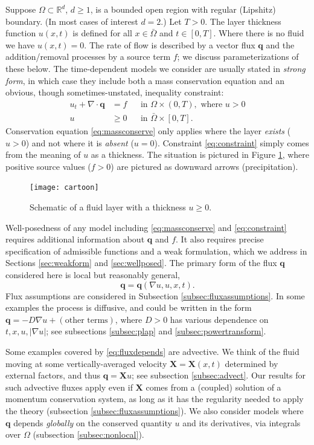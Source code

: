 \documentclass[final,leqno,onefignum,onetabnum]{siamltex1213bueler}
\newcommand\bq{\mathbf{q}}
\newcommand\bX{\mathbf{X}}
\newcommand{\Div}{\nabla\cdot}
\renewcommand{\grad}{\nabla}
\newcommand\RR{\mathbb{R}}
\begin{document}
Suppose $\Omega \subset \RR^d$, $d\ge 1$, is a bounded open region with regular (Lipshitz) boundary.  (In most cases of interest $d=2$.)  Let $T>0$.  The layer thickness function $u(x,t)$ is defined for all $x\in \bar\Omega$ and $t \in [0,T]$.  Where there is no fluid we have $u(x,t)=0$.  The rate of flow is described by a vector flux $\bq$ and the addition/removal processes by a source term $f$; we discuss parameterizations of these below.  The time-dependent models we consider are usually stated in \emph{strong form}, in which case they include both a mass conservation equation and an obvious, though sometimes-unstated, inequality constraint:
\begin{align}
u_t + \Div \bq &= f &&\text{in } \Omega \times (0,T), \text{ where } u > 0 \label{eq:massconserve} \\
u &\ge 0 &&\text{in } \bar\Omega \times [0,T]. \label{eq:constraint}
\end{align}
Conservation equation \eqref{eq:massconserve} only applies where the layer \emph{exists} ($u>0$) and not where it is \emph{absent} ($u=0$).  Constraint \eqref{eq:constraint} simply comes from the meaning of $u$ as a thickness.  The situation is pictured in Figure \ref{fig:cartoon}, where positive source values ($f>0$) are pictured as downward arrows (precipitation).

\begin{figure}[ht]
\centerline{\texttt{[image: cartoon]}}
\caption{Schematic of a fluid layer with a thickness $u\ge 0$.}
\label{fig:cartoon}
\end{figure}

Well-posedness of any model including \eqref{eq:massconserve} and \eqref{eq:constraint} requires additional information about $\bq$ and $f$.  It also requires precise specification of admissible functions and a weak formulation, which we address in Sections \ref{sec:weakform} and \ref{sec:wellposed}.  The primary form of the flux $\bq$ considered here is local but reasonably general,
\begin{equation}
\bq = \bq(\grad u,u,x,t). \label{eq:fluxdepends}
\end{equation}
Flux assumptions are considered in Subsection \ref{subsec:fluxassumptions}.  In some examples the process is diffusive, and could be written in the form $\bq=- D \grad u + (\text{other terms})$, where $D > 0$ has various dependence on $t,x,u,|\grad u|$; see subsections \ref{subsec:plap} and \ref{subsec:powertransform}.

Some examples covered by \eqref{eq:fluxdepends} are advective.  We think of the fluid moving at some vertically-averaged velocity $\bX=\bX(x,t)$ determined by external factors, and thus $\bq = \bX u$; see subsection \ref{subsec:advect}.  Our results for such advective fluxes apply even if $\bX$ comes from a (coupled) solution of a momentum conservation system, as long as it has the regularity needed to apply the theory (subsection \ref{subsec:fluxassumptions}).  We also consider models where $\bq$ depends \emph{globally} on the conserved quantity $u$ and its derivatives, via integrals over $\Omega$ (subsection \ref{subsec:nonlocal}).
\end{document}
